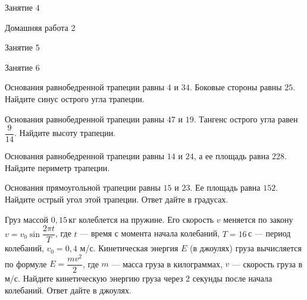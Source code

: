 \begin{class}[number=4]
	\begin{listofex}
		\item Занятие 4
	\end{listofex}
\end{class}

\begin{homework}[number=2]
	\begin{listofex}
		\item Домашняя работа 2
	\end{listofex}
\end{homework}

\begin{class}[number=5]
	\begin{listofex}
		\item Занятие 5
	\end{listofex}
\end{class}

\begin{class}[number=6]
	\begin{listofex}
		\item Занятие 6
	\end{listofex}
\end{class}

\begin{homework}[number=3]
	\begin{listofex}
		\item Основания равнобедренной трапеции равны \( 4 \) и \( 34 \). Боковые стороны равны \( 25 \). Найдите синус острого угла трапеции.
		\item Основания равнобедренной трапеции равны \( 47 \) и \( 19 \). Тангенс острого угла равен \( \dfrac{9}{14} \).  Найдите высоту трапеции.
		\item Основания равнобедренной трапеции равны \( 14 \) и \( 24 \), а ее площадь равна \( 228 \). Найдите периметр трапеции.
		\item Основания прямоугольной трапеции равны \( 15 \) и \( 23 \). Ее площадь равна \( 152 \). Найдите острый угол этой трапеции. Ответ дайте в градусах.
		\item Груз массой \( 0,15 \) кг колеблется на пружине. Его скорость \( v \) меняется по закону \( v=v_0\sin\dfrac{2\pi t}{T} \),  где \( t \) --- время с момента начала колебаний, \( T=16 \) с --- период колебаний,  \( v_0=0,4 \) м/с. Кинетическая энергия \( E \) (в джоулях) груза вычисляется по формуле \( E=\dfrac{mv^2}{2} \),  где \( m \) --- масса груза в килограммах, \( v \) --- скорость груза в м/с. Найдите кинетическую энергию груза через \( 2 \) секунды после начала колебаний. Ответ дайте в джоулях.
	\end{listofex}
\end{homework}

